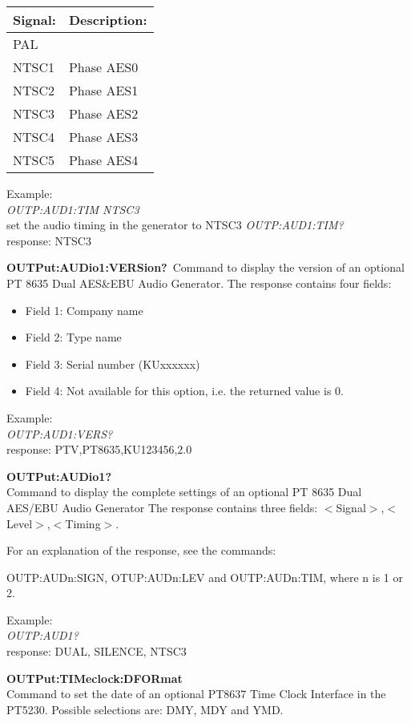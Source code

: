 \begin{tabular}{|l|l|}
\hline
Signal:		& Description: \\ \hline
PAL				&	\\ \hline
NTSC1			& Phase AES0\\ \hline
NTSC2			& Phase AES1\\ \hline
NTSC3			& Phase AES2\\ \hline
NTSC4			& Phase AES3\\ \hline
NTSC5			& Phase AES4\\ \hline
\end{tabular}

Example:\\
\textit{OUTP:AUD1:TIM NTSC3}\\
set the audio timing in the generator to NTSC3
\textit{OUTP:AUD1:TIM?}\\
response: NTSC3

\textbf{OUTPut:AUDio1:VERSion?}\
Command to display the version of an optional PT 8635 Dual AES\&EBU Audio Generator. The response contains four fields:
\begin{itemize}
\item Field 1: Company name
\item Field 2: Type name
\item Field 3: Serial number (KUxxxxxx)
\item Field 4: Not available for this option, i.e. the returned value is 0.
\end{itemize}

Example:\\
\textit{OUTP:AUD1:VERS?}\\
response: PTV,PT8635,KU123456,2.0

\textbf{OUTPut:AUDio1?}\\
Command to display the complete settings of an optional PT 8635 Dual AES/EBU Audio Generator The response contains three fields:
$<$Signal$>$,$<$Level$>$,$<$Timing$>$. 

For an explanation of the response, see the commands: 

OUTP:AUDn:SIGN, OTUP:AUDn:LEV and OUTP:AUDn:TIM, where n is 1 or 2.

Example:\\
\textit{OUTP:AUD1?}\\
response: DUAL, SILENCE, NTSC3

\textbf{OUTPut:TIMeclock:DFORmat}\\
Command to set the date of an optional PT8637 Time Clock Interface in the PT5230. Possible selections are: DMY, MDY and YMD.

